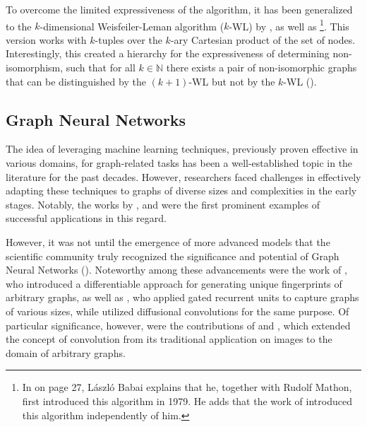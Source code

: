 To overcome the limited expressiveness of the \wl algorithm, it has been generalized to the $k$-dimensional Weisfeiler-Leman algorithm ($k$-WL) by \cite{Bab1979, Babai2016}, as well as \cite{Imm+1990}\footnote{In \cite{Babai2016} on page 27, László Babai explains that he, together with Rudolf Mathon, first introduced this algorithm in 1979. He adds that the work of \cite{Imm+1990} introduced this algorithm independently of him.}. This version works with $k$-tuples over the $k$-ary Cartesian product of the set of nodes. Interestingly, this created a hierarchy for the expressiveness of determining non-isomorphism, such that for all $k \in \mathbb{N}$ there exists a pair of non-isomorphic graphs that can be distinguished by the \textsf{$(k+1)$-WL} but not by the \textsf{$k$-WL} (\cite{Cai1992}).

\subsection{Graph Neural Networks}\label{sec:related_work_gnn}
The idea of leveraging machine learning techniques, previously proven effective in various domains, for graph-related tasks has been a well-established topic in the literature for the past decades. However, researchers faced challenges in effectively adapting these techniques to graphs of diverse sizes and complexities in the early stages. Notably, the works by \cite{Sperduti1997,Scarselli2008}, and \cite{Micheli2009} were the first prominent examples of successful applications in this regard.

However, it was not until the emergence of more advanced models that the scientific community truly recognized the significance and potential of \textsf{Graph Neural Networks} (\gnns). Noteworthy among these advancements were the work of \cite{Duvenaud2015}, who introduced a differentiable approach for generating unique fingerprints of arbitrary graphs, as well as \cite{Li2015}, who applied gated recurrent units to capture graphs of various sizes, while \cite{Atwood2016} utilized diffusional convolutions for the same purpose. Of particular significance, however, were the contributions of \cite{Bruna2013,Defferrard2016} and \cite{Kip+2017}, which extended the concept of convolution from its traditional application on images to the domain of arbitrary graphs.

